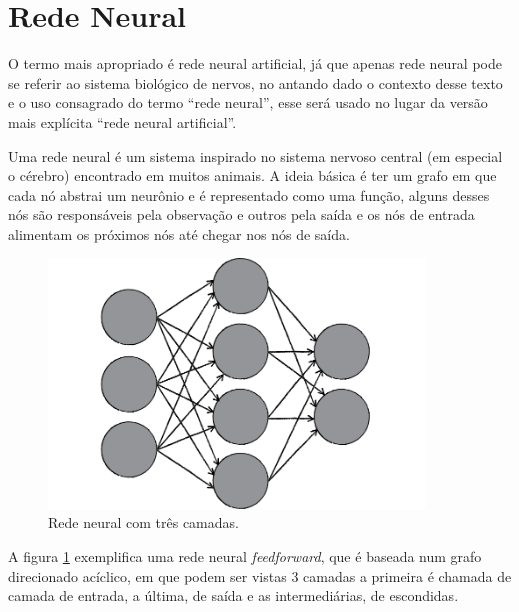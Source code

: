 \section{Rede Neural}

O termo mais apropriado é rede neural artificial, já que apenas rede
neural pode se referir ao sistema biológico de nervos, no antando dado o
contexto desse texto e o uso consagrado do termo ``rede neural'', esse
será usado no lugar da versão mais explícita ``rede neural artificial''.

Uma rede neural é um sistema inspirado no sistema nervoso central (em
especial o cérebro) encontrado em muitos animais. A ideia básica é ter
um grafo em que cada nó abstrai um neurônio e é representado como uma
função, alguns desses nós são responsáveis pela observação e outros pela
saída e os nós de entrada alimentam os próximos nós até chegar nos nós
de saída. \cite{haykin2001redes}


\begin{figure}[H]
\centering
\includegraphics[width=10cm]{figuras/rede_neural_grafo}
\caption{Rede neural com três camadas.}\label{fig:rede_neural_grafo}
\end{figure}

A figura \ref{fig:rede_neural_grafo} exemplifica uma rede neural \emph{feedforward},
que é baseada num grafo direcionado acíclico, em que podem ser vistas 3 camadas
a primeira é chamada de camada de entrada, a última, de saída e as intermediárias,
de escondidas. \cite{shiffman2012nature}

